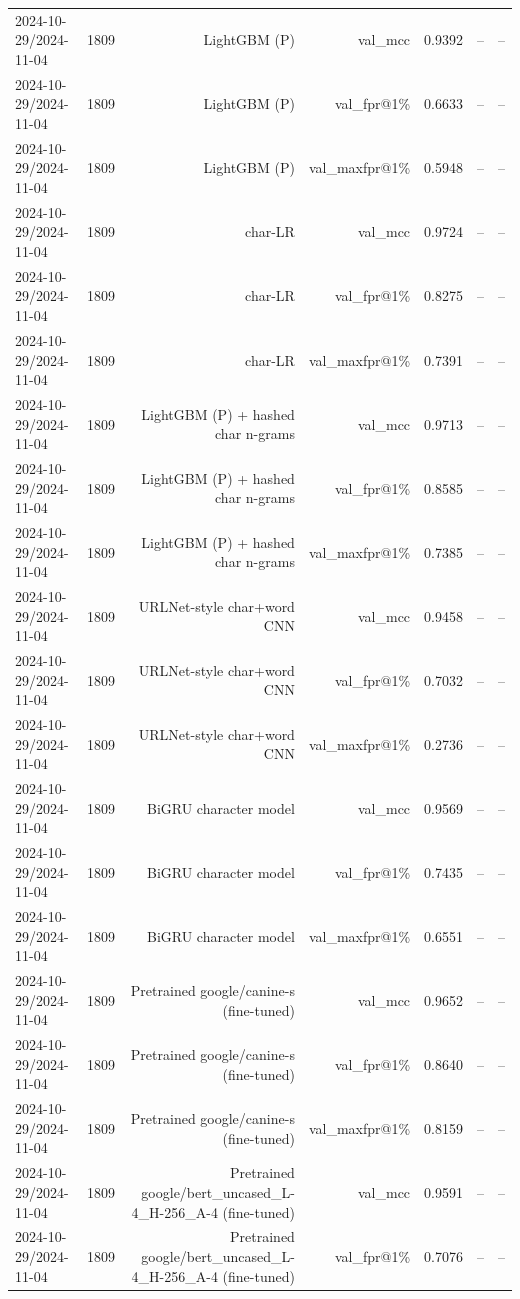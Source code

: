 \begin{table}[t]
\begin{tabular}{llrrrrr}
2024-10-29/2024-11-04 & 1809 & LightGBM (P) & val\_mcc & 0.9392 & -- & -- \\
2024-10-29/2024-11-04 & 1809 & LightGBM (P) & val\_fpr@1\% & 0.6633 & -- & -- \\
2024-10-29/2024-11-04 & 1809 & LightGBM (P) & val\_maxfpr@1\% & 0.5948 & -- & -- \\
2024-10-29/2024-11-04 & 1809 & char-LR & val\_mcc & 0.9724 & -- & -- \\
2024-10-29/2024-11-04 & 1809 & char-LR & val\_fpr@1\% & 0.8275 & -- & -- \\
2024-10-29/2024-11-04 & 1809 & char-LR & val\_maxfpr@1\% & 0.7391 & -- & -- \\
2024-10-29/2024-11-04 & 1809 & LightGBM (P) + hashed char n-grams & val\_mcc & 0.9713 & -- & -- \\
2024-10-29/2024-11-04 & 1809 & LightGBM (P) + hashed char n-grams & val\_fpr@1\% & 0.8585 & -- & -- \\
2024-10-29/2024-11-04 & 1809 & LightGBM (P) + hashed char n-grams & val\_maxfpr@1\% & 0.7385 & -- & -- \\
2024-10-29/2024-11-04 & 1809 & URLNet-style char+word CNN & val\_mcc & 0.9458 & -- & -- \\
2024-10-29/2024-11-04 & 1809 & URLNet-style char+word CNN & val\_fpr@1\% & 0.7032 & -- & -- \\
2024-10-29/2024-11-04 & 1809 & URLNet-style char+word CNN & val\_maxfpr@1\% & 0.2736 & -- & -- \\
2024-10-29/2024-11-04 & 1809 & BiGRU character model & val\_mcc & 0.9569 & -- & -- \\
2024-10-29/2024-11-04 & 1809 & BiGRU character model & val\_fpr@1\% & 0.7435 & -- & -- \\
2024-10-29/2024-11-04 & 1809 & BiGRU character model & val\_maxfpr@1\% & 0.6551 & -- & -- \\
2024-10-29/2024-11-04 & 1809 & Pretrained google/canine-s (fine-tuned) & val\_mcc & 0.9652 & -- & -- \\
2024-10-29/2024-11-04 & 1809 & Pretrained google/canine-s (fine-tuned) & val\_fpr@1\% & 0.8640 & -- & -- \\
2024-10-29/2024-11-04 & 1809 & Pretrained google/canine-s (fine-tuned) & val\_maxfpr@1\% & 0.8159 & -- & -- \\
2024-10-29/2024-11-04 & 1809 & Pretrained google/bert\_uncased\_L-4\_H-256\_A-4 (fine-tuned) & val\_mcc & 0.9591 & -- & -- \\
2024-10-29/2024-11-04 & 1809 & Pretrained google/bert\_uncased\_L-4\_H-256\_A-4 (fine-tuned) & val\_fpr@1\% & 0.7076 & -- & -- \\

\end{tabular}
\end{table}
